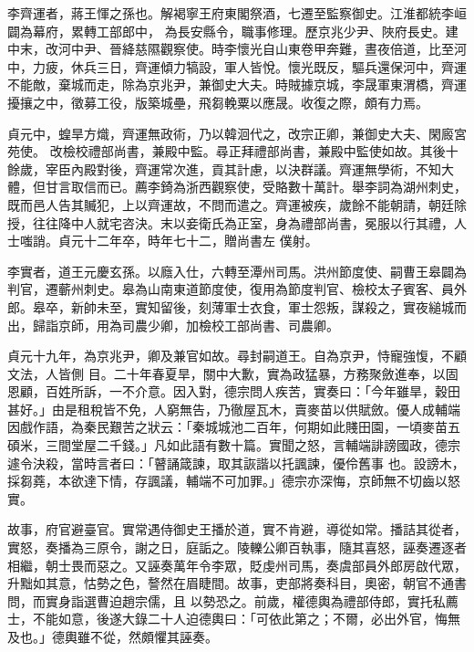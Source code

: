 \begin{pinyinscope}
 李齊運者，蔣王惲之孫也。解褐寧王府東閣祭酒，七遷至監察御史。江淮都統李峘闢為幕府，累轉工部郎中，
 為長安縣令，職事修理。歷京兆少尹、陜府長史。建中末，改河中尹、晉絳慈隰觀察使。時李懷光自山東卷甲奔難，晝夜倍道，比至河中，力疲，休兵三日，齊運傾力犒設，軍人皆悅。懷光既反，驅兵還保河中，齊運不能敵，棄城而走，除為京兆尹，兼御史大夫。時賊據京城，李晟軍東渭橋，齊運擾攘之中，徵募工役，版築城壘，飛芻輓粟以應晟。收復之際，頗有力焉。



 貞元中，蝗旱方熾，齊運無政術，乃以韓洄代之，改宗正卿，兼御史大夫、閑廄宮苑使。
 改檢校禮部尚書，兼殿中監。尋正拜禮部尚書，兼殿中監使如故。其後十餘歲，宰臣內殿對後，齊運常次進，貢其計慮，以決群議。齊運無學術，不知大體，但甘言取信而已。薦李錡為浙西觀察使，受賂數十萬計。舉李詞為湖州刺史，既而邑人告其贓犯，上以齊運故，不問而遣之。齊運被疾，歲餘不能朝請，朝廷除授，往往降中人就宅咨決。末以妾衛氏為正室，身為禮部尚書，冕服以行其禮，人士嗤誚。貞元十二年卒，時年七十二，贈尚書左
 僕射。



 李實者，道王元慶玄孫。以廕入仕，六轉至潭州司馬。洪州節度使、嗣曹王皋闢為判官，遷蘄州刺史。皋為山南東道節度使，復用為節度判官、檢校太子賓客、員外郎。皋卒，新帥未至，實知留後，刻薄軍士衣食，軍士怨叛，謀殺之，實夜縋城而出，歸詣京師，用為司農少卿，加檢校工部尚書、司農卿。



 貞元十九年，為京兆尹，卿及兼官如故。尋封嗣道王。自為京尹，恃寵強愎，不顧文法，人皆側
 目。二十年春夏旱，關中大歉，實為政猛暴，方務聚斂進奉，以固恩顧，百姓所訴，一不介意。因入對，德宗問人疾苦，實奏曰：「今年雖旱，穀田甚好。」由是租稅皆不免，人窮無告，乃徹屋瓦木，賣麥苗以供賦斂。優人成輔端因戲作語，為秦民艱苦之狀云：「秦城城池二百年，何期如此賤田園，一頃麥苗五碩米，三間堂屋二千錢。」凡如此語有數十篇。實聞之怒，言輔端誹謗國政，德宗遽令決殺，當時言者曰：「瞽誦箴諫，取其詼諧以托諷諫，優伶舊事
 也。設謗木，採芻蕘，本欲達下情，存諷議，輔端不可加罪。」德宗亦深悔，京師無不切齒以怒實。



 故事，府官避臺官。實常遇侍御史王播於道，實不肯避，導從如常。播詰其從者，實怒，奏播為三原令，謝之日，庭詬之。陵轢公卿百執事，隨其喜怒，誣奏遷逐者相繼，朝士畏而惡之。又誣奏萬年令李眾，貶虔州司馬，奏虞部員外郎房啟代眾，升黜如其意，怙勢之色，謷然在眉睫間。故事，吏部將奏科目，奧密，朝官不通書問，而實身詣選曹迫趙宗儒，且
 以勢恐之。前歲，權德輿為禮部侍郎，實托私薦士，不能如意，後遂大錄二十人迫德輿曰：「可依此第之；不爾，必出外官，悔無及也。」德輿雖不從，然頗懼其誣奏。




\end{pinyinscope}
